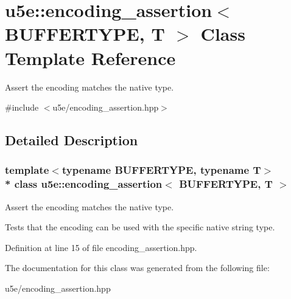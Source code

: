 \hypertarget{classu5e_1_1encoding__assertion}{}\section{u5e\+:\+:encoding\+\_\+assertion$<$ B\+U\+F\+F\+E\+R\+T\+Y\+PE, T $>$ Class Template Reference}
\label{classu5e_1_1encoding__assertion}


Assert the encoding matches the native type.  




{\ttfamily \#include $<$u5e/encoding\+\_\+assertion.\+hpp$>$}



\subsection{Detailed Description}
\subsubsection*{template$<$typename B\+U\+F\+F\+E\+R\+T\+Y\+PE, typename T$>$\\*
class u5e\+::encoding\+\_\+assertion$<$ B\+U\+F\+F\+E\+R\+T\+Y\+P\+E, T $>$}

Assert the encoding matches the native type. 

Tests that the encoding can be used with the specific native string type. 

Definition at line 15 of file encoding\+\_\+assertion.\+hpp.



The documentation for this class was generated from the following file\+:\begin{DoxyCompactItemize}
\item 
u5e/encoding\+\_\+assertion.\+hpp\end{DoxyCompactItemize}
